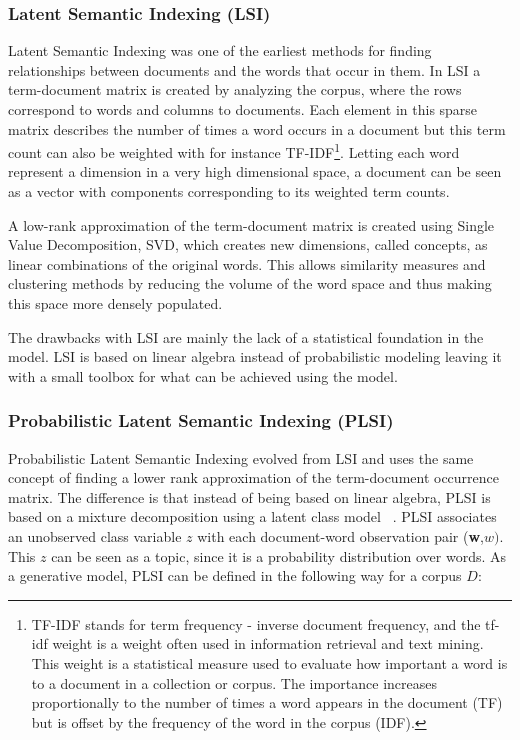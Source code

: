 \documentclass[12pt]{report}
\begin{document}
\subsubsection{Latent Semantic Indexing (LSI)}

Latent Semantic Indexing was one of the earliest methods for finding
relationships between documents and the words that occur in
them\cite{Deerwester90indexingby}. In LSI a term-document matrix is
created by analyzing the corpus, where the rows correspond to words
and columns to documents. Each element in this sparse matrix describes
the number of times a word occurs in a document but this term count
can also be weighted with for instance TF-IDF\footnote{TF-IDF stands 
for term frequency - inverse document frequency, and the tf-idf weight is 
a weight often used in information retrieval and text mining. This weight 
is a statistical measure used to evaluate how important a word is to 
a document in a collection or corpus. The importance increases
proportionally to the number of times a word appears in the document (TF) but
is offset by the frequency of the word in the corpus (IDF).}. Letting
each word represent a dimension in a very high dimensional space, a
document can be seen as a vector with components corresponding to its
weighted term counts\cite{Salton:1988:TAA:54259.54260}.

A low-rank approximation of the term-document matrix is created using Single
Value Decomposition, SVD, which creates new dimensions, called concepts, as
linear combinations of the original words. This allows similarity measures and
clustering methods by reducing the volume of the word space and thus making
this space more densely populated.

The drawbacks with LSI are mainly the lack of a statistical foundation in the
model. LSI is based on linear algebra instead of probabilistic modeling leaving
it with a small toolbox for what can be achieved using the model.

\subsubsection{Probabilistic Latent Semantic Indexing (PLSI)}

Probabilistic Latent Semantic Indexing evolved from LSI and uses the same
concept of finding a lower rank approximation of the term-document occurrence
matrix. The difference is that instead of being based on linear algebra, PLSI
is based on a mixture decomposition using a latent class model
~\cite{Hofmann:1999:PLS:312624.312649}. PLSI associates an unobserved class 
variable $z$ with each document-word observation pair (\textbf{w},$
w)$. This $z$ can be seen as a topic, since it is a probability distribution
over words. As a generative model, PLSI can be defined in the following way 
for a corpus $D$:
\end{document}
